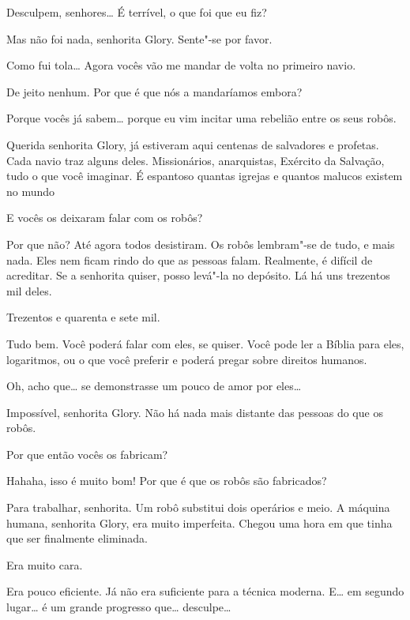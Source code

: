   Desculpem, senhores\ldots{} É terrível,
o que foi que eu fiz?

 Mas não foi nada, senhorita Glory. Sente"-se por favor.

  Como fui tola\ldots{} Agora vocês vão me
mandar de volta no primeiro navio.

 De jeito nenhum. Por que é que nós a mandaríamos embora?

 Porque vocês já sabem\ldots{} porque eu vim incitar uma rebelião entre os seus robôs.

 Querida senhorita Glory, já estiveram aqui centenas de salvadores e
profetas. Cada navio traz alguns deles. Missionários, anarquistas, Exército da
Salvação, tudo o que você imaginar. É espantoso quantas igrejas e quantos malucos existem
no mundo

 E vocês os deixaram falar com os robôs?

 Por que não? Até agora todos desistiram. Os robôs lembram"-se de tudo, e
mais nada. Eles nem ficam rindo do que as pessoas falam. Realmente, é
difícil de acreditar. Se a senhorita quiser, posso levá"-la no depósito. Lá há uns
trezentos mil deles.

 Trezentos e quarenta e sete mil.

 Tudo bem. Você poderá falar com eles, se quiser. Você pode ler a Bíblia
para eles, logaritmos, ou o que você preferir e poderá pregar sobre direitos humanos.

 Oh, acho que\ldots{} se demonstrasse um pouco de amor por eles\ldots{}

 Impossível, senhorita Glory. Não há nada mais distante das pessoas do que
os robôs.

 Por que então vocês os fabricam?

 Hahaha, isso é muito bom! Por que é que os robôs são fabricados?

 Para trabalhar, senhorita. Um robô substitui dois operários e meio. A
máquina humana, senhorita Glory, era muito imperfeita. Chegou uma hora em que
tinha que ser finalmente eliminada.

 Era muito cara.

 Era pouco eficiente. Já não era suficiente para a técnica moderna. E\ldots{}
em segundo lugar\ldots{} é um grande progresso que\ldots{} desculpe\ldots{}

